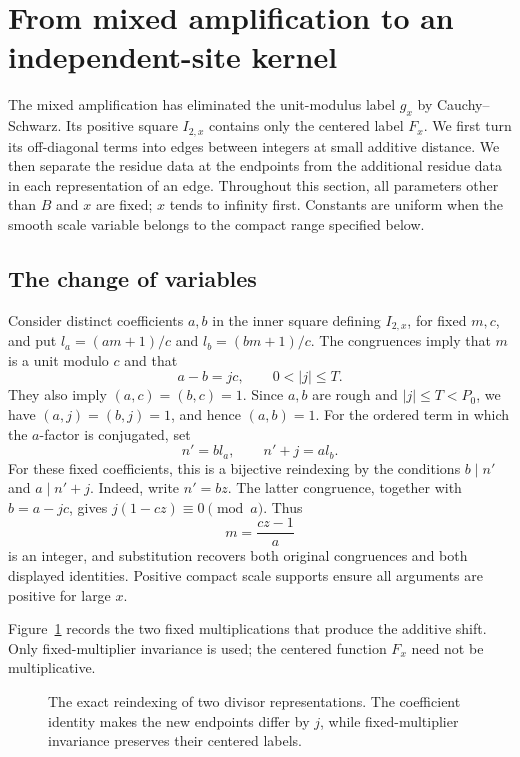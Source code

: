 \section{From mixed amplification to an independent-site kernel}
\label{sec:graph}

The mixed amplification has eliminated the unit-modulus label $g_x$ by
Cauchy--Schwarz. Its positive square $I_{2,x}$ contains only the centered
label $F_x$. We first turn its off-diagonal terms into edges between
integers at small additive distance. We then separate the residue data at
the endpoints from the additional residue data in each representation of
an edge. Throughout this section, all parameters other
than $B$ and $x$ are fixed; $x$ tends to infinity first. Constants are
uniform when the smooth scale variable belongs to the compact range
specified below.

\subsection{The change of variables}

Consider distinct coefficients $a,b$ in the inner square defining
$I_{2,x}$, for fixed $m,c$, and put $l_a=(am+1)/c$ and
$l_b=(bm+1)/c$. The congruences imply that $m$ is a unit modulo $c$
and that
\[
 a-b=jc,\qquad 0<|j|\le T.
\]
They also imply $(a,c)=(b,c)=1$. Since $a,b$ are rough and
$|j|\le T<P_0$, we have $(a,j)=(b,j)=1$, and hence $(a,b)=1$.
For the ordered term in which the $a$-factor is conjugated, set
\[
 n'=b l_a,\qquad n'+j=a l_b.
\]
For these fixed coefficients, this is a bijective reindexing by the
conditions $b\mid n'$ and $a\mid n'+j$. Indeed, write $n'=bz$.
The latter congruence, together with $b=a-jc$, gives
$j(1-cz)\equiv0\pmod a$. Thus
\[
 m=\frac{cz-1}{a}
\]
is an integer, and substitution recovers both original congruences and
both displayed identities. Positive compact scale supports ensure all
arguments are positive for large $x$.

Figure~\ref{fig:graph-reindexing} records the two fixed multiplications
that produce the additive shift. Only fixed-multiplier invariance is used;
the centered function $F_x$ need not be multiplicative.

\begin{figure}[htbp]
\centering
{}
\caption{The exact reindexing of two divisor representations. The
coefficient identity makes the new endpoints differ by $j$, while
fixed-multiplier invariance preserves their centered labels.}
\label{fig:graph-reindexing}
\end{figure}

